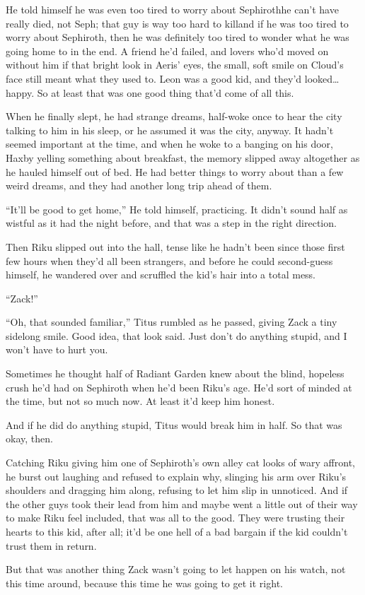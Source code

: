 He told himself he was even too tired to worry about Sephiroth\textemdash he can't have really died, not Seph; that guy is way too hard to kill\textemdash and if he was too tired to worry about Sephiroth, then he was definitely too tired to wonder what he was going home to in the end. A friend he'd failed, and lovers who'd moved on without him if that bright look in Aeris' eyes, the small, soft smile on Cloud's face still meant what they used to. Leon was a good kid, and they'd looked\ldots happy. So at least that was one good thing that'd come of all this.

When he finally slept, he had strange dreams, half-woke once to hear the city talking to him in his sleep, or he assumed it was the city, anyway. It hadn't seemed important at the time, and when he woke to a banging on his door, Haxby yelling something about breakfast, the memory slipped away altogether as he hauled himself out of bed. He had better things to worry about than a few weird dreams, and they had another long trip ahead of them.

``It'll be good to get home,'' He told himself, practicing. It didn't sound half as wistful as it had the night before, and that was a step in the right direction.

Then Riku slipped out into the hall, tense like he hadn't been since those first few hours when they'd all been strangers, and before he could second-guess himself, he wandered over and scruffled the kid's hair into a total mess.

``Zack!''

``Oh, that sounded familiar,'' Titus rumbled as he passed, giving Zack a tiny sidelong smile. Good idea, that look said. Just don't do anything stupid, and I won't have to hurt you.

Sometimes he thought half of Radiant Garden knew about the blind, hopeless crush he'd had on Sephiroth when he'd been Riku's age. He'd sort of minded at the time, but not so much now. At least it'd keep him honest.

And if he did do anything stupid, Titus would break him in half. So that was okay, then.

Catching Riku giving him one of Sephiroth's own alley cat looks of wary affront, he burst out laughing and refused to explain why, slinging his arm over Riku's shoulders and dragging him along, refusing to let him slip in unnoticed. And if the other guys took their lead from him and maybe went a little out of their way to make Riku feel included, that was all to the good. They were trusting their hearts to this kid, after all; it'd be one hell of a bad bargain if the kid couldn't trust them in return.

But that was another thing Zack wasn't going to let happen on his watch, not this time around, because this time he was going to get it right.
